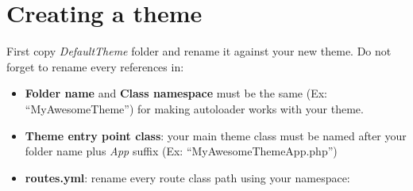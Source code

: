 \documentclass[letterpaper,10pt,english]{sphinxmanual}
\begin{document}
\chapter{Creating a theme}
\label{themes/create_theme:create-theme}\label{themes/create_theme::doc}\label{themes/create_theme:creating-a-theme}
First copy \emph{DefaultTheme} folder and rename it against your new theme.
Do not forget to rename every references in:
\begin{itemize}
\item {} 
\textbf{Folder name} and \textbf{Class namespace} must be the same (Ex: “MyAwesomeTheme”) for making autoloader works with your theme.

\item {} 
\textbf{Theme entry point class}: your main theme class must be named after your folder name plus \emph{App} suffix (Ex: “MyAwesomeThemeApp.php”)

\item {} 
\textbf{routes.yml}: rename every route class path using your namespace:

\end{itemize}
\end{document}

